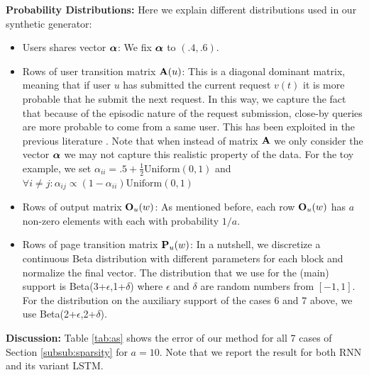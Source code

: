 \documentclass[conference]{IEEEtran}
\begin{document}
	{\bf Probability Distributions:}
	\label{subsub:dist}
	Here we explain different distributions used in our synthetic generator:
	\begin{itemize}
		\item {Users shares vector $\aalpha$:} We fix $\aalpha$ to $(.4, .6)$.
		
		\item {Rows of user transition matrix $\A(u)$:} This is a diagonal dominant matrix, meaning that if user $u$ has submitted the current request $v(t)$ it is more probable that he submit the next request. 
		In this way, we capture the fact that because of the episodic nature of the request submission, close-by queries are more probable to come from a same user. 
		This has been exploited in the previous literature \cite{sigcomm}. Note that when instead of matrix $\A$ we only consider the vector $\aalpha$ we may not capture this realistic property of the data.
		For the toy example, we set $\alpha_{ii} = .5 + \frac{1}{2} \text{Uniform}(0,1)$ and $\forall i \neq j: \alpha_{ij} \propto (1 - \alpha_{ii}) \text{Uniform}(0,1)$
		
		\item {Rows of output matrix $\O_u(w)$:} As mentioned before, each row $\O_u(w)$ has $a$ non-zero elements with each with probability $1/a$.
		
		\item {Rows of page transition matrix $\P_u(w)$:} In a nutshell, we discretize a continuous Beta distribution with different parameters for each block and normalize the final vector.
		The distribution that we use for the (main) support is Beta(3+$\epsilon$,1+$\delta$) where $\epsilon$ and $\delta$ are random numbers from $[-1, 1]$. 
		For the distribution on the auxiliary support of the cases 6 and 7 above, we use Beta(2+$\epsilon$,2+$\delta$).
	\end{itemize}
	
	
	
	{\bf Discussion:}
	Table \ref{tab:as} shows the error of our method for all 7 cases of Section \ref{subsub:sparsity} for $a = 10$. 
	Note that we report the result for both RNN and its variant LSTM. 
	
\end{document}
